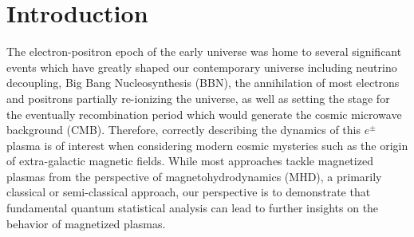 \documentclass[Universe,article,submit,moreauthors,pdftex]{Definitions/mdpi}
\begin{document}
\section{Introduction}
\noindent The electron-positron epoch of the early universe was home to several significant events which have greatly shaped our contemporary universe including neutrino decoupling, Big Bang Nucleosynthesis (BBN), the annihilation of most electrons and positrons partially re-ionizing the universe, as well as setting the stage for the eventually recombination period which would generate the cosmic microwave background (CMB). Therefore, correctly describing the dynamics of this $e^{\pm}$ plasma is of interest when considering modern cosmic mysteries such as the origin of extra-galactic magnetic fields. While most approaches tackle magnetized plasmas from the perspective of magnetohydrodynamics (MHD), a primarily classical or semi-classical approach, our perspective is to demonstrate that fundamental quantum statistical analysis can lead to further insights on the behavior of magnetized plasmas.
\end{document}
